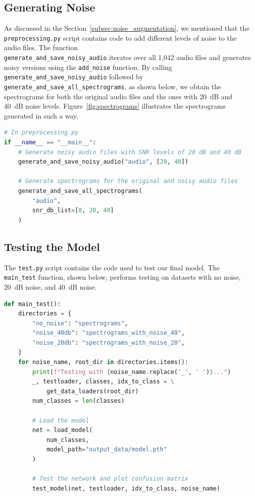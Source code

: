 \documentclass[12pt]{article}
\begin{document}
\subsection{Generating Noise}

As discussed in the Section~\ref{subsec:noise_augmentation}, we mentioned that the \texttt{preprocessing.py} script contains code to add different levels of noise to the audio files. The function \\ \texttt{generate\_and\_save\_noisy\_audio} iterates over all 1,042 audio files and generates noisy versions using the \texttt{add\_noise} function. By calling \texttt{generate\_and\_save\_noisy\_audio} followed by \texttt{generate\_and\_save\_all\_spectrograms}, as shown below, we obtain the spectrograms for both the original audio files and the ones with 20~dB and 40~dB noise levels. Figure~\ref{fig:spectrograms} illustrates the spectrograms generated in such a way.

\begin{lstlisting}[language=Python, caption=Generating Noisy Audio and Spectrograms]
# In preprocessing.py
if __name__ == "__main__":
    # Generate noisy audio files with SNR levels of 20 dB and 40 dB
    generate_and_save_noisy_audio("audio", [20, 40])

    # Generate spectrograms for the original and noisy audio files
    generate_and_save_all_spectrograms(
        "audio",
        snr_db_list=[0, 20, 40]
    )
\end{lstlisting}

\subsection{Testing the Model}

The \texttt{test.py} script contains the code used to test our final model. The \texttt{main\_test} function, shown below, performs testing on datasets with no noise, 20~dB noise, and 40~dB noise.

\begin{lstlisting}[language=Python, caption=Main Testing Function]
def main_test():
    directories = {
        "no_noise": "spectrograms",
        "noise_40db": "spectrograms_with_noise_40",
        "noise_20db": "spectrograms_with_noise_20",
    }
    for noise_name, root_dir in directories.items():
        print(f"Testing with {noise_name.replace('_', ' ')}...")
        _, testloader, classes, idx_to_class = \
            get_data_loaders(root_dir)
        num_classes = len(classes)

        # Load the model
        net = load_model(
            num_classes,
            model_path="output_data/model.pth"
        )

        # Test the network and plot confusion matrix
        test_model(net, testloader, idx_to_class, noise_name)
\end{lstlisting}
\end{document}
